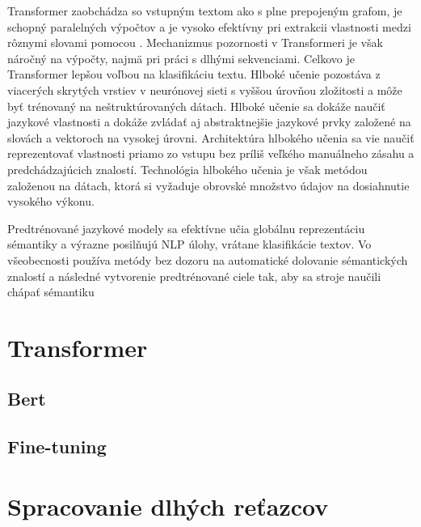 Transformer zaobchádza so vstupným textom ako s plne prepojeným grafom, je schopný paralelných výpočtov a je vysoko efektívny pri extrakcii vlastnosti medzi rôznymi slovami pomocou . Mechanizmus pozornosti v Transformeri je však náročný na výpočty, najmä pri práci s dlhými sekvenciami. Celkovo je Transformer lepšou voľbou na klasifikáciu textu. 
Hlboké učenie pozostáva z viacerých skrytých vrstiev v neurónovej sieti s vyššou úrovňou zložitosti a môže byť trénovaný na neštruktúrovaných dátach. Hlboké učenie sa dokáže naučiť jazykové vlastnosti a dokáže zvládať aj abstraktnejšie jazykové prvky založené na slovách a vektoroch na vysokej úrovni. Architektúra hlbokého učenia sa vie naučiť reprezentovať vlastnosti priamo zo vstupu bez príliš veľkého manuálneho zásahu a predchádzajúcich znalostí. Technológia hlbokého učenia je však metódou založenou na dátach, ktorá si vyžaduje obrovské množstvo údajov na dosiahnutie vysokého výkonu. 

Predtrénované jazykové modely sa efektívne učia globálnu reprezentáciu sémantiky a výrazne posilňujú NLP úlohy, vrátane klasifikácie textov. Vo všeobecnosti používa metódy bez dozoru na automatické dolovanie sémantických znalostí a následné vytvorenie predtrénované ciele tak, aby sa stroje naučili chápať sémantiku

\section{Transformer}

\subsection{Bert}

\subsection{Fine-tuning}


\section{Spracovanie dlhých reťazcov}


